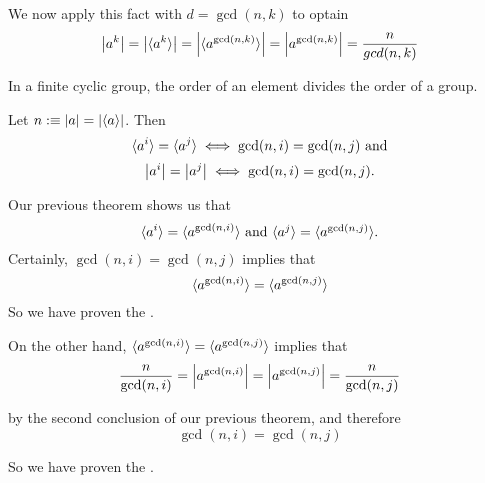 \begin{prf}
  We now apply this fact with $d=\gcd(n,k)$ to optain
  \begin{equation}
    \abs{a^k} = \abs{\langle a^k \rangle} = \abs{ \langle a^{\gcd (n,k)} \rangle } = \abs{a^{\gcd(n,k)}} = \frac{n}{gcd(n,k)}
  \end{equation}
\end{prf}

\setcounter{corollary}{0}

\begin{corollary}
  In a finite cyclic group, the order of an element divides the order of a group.
\end{corollary}

\begin{corollary}[Criterion for $\la a^i \ra = \la a^j \ra$ and $\abs{a^i} = \abs{a^j}$]
  Let $n:\equiv \abs{a}=\abs{\langle a \rangle}$. Then
  \begin{equation}
    \la a^i \ra = \la a^j \ra \iff \gcd(n,i) = \gcd(n,j) $ and$
  \end{equation}
  \begin{equation}
    \abs{a^i} = \abs{a^j} \iff \gcd(n,i)=\gcd(n,j).
  \end{equation}
\end{corollary}
\begin{prf}
  Our previous theorem shows us that
  \begin{equation}
    \la a^i \ra = \la a^{\gcd(n,i)}\ra $ and $ \la a^j \ra = \la  a^{\gcd(n,j)} \ra.
  \end{equation}
  Certainly, $\gcd(n,i) = \gcd(n,j)$ implies that
  \begin{equation}
    \langle a^{\gcd(n,i)} \rangle = \langle a^{\gcd(n,j)} \rangle
  \end{equation}
  So we have proven the .

  On the other hand, $\langle a^{\gcd(n,i)} \rangle = \langle a^{\gcd(n,j)} \rangle$ implies that
  \begin{equation}
    \frac{n}{\gcd(n,i)}=\abs{a^{\gcd(n,i)} } = \abs{ a^{\gcd(n,j)} }=\frac{n}{\gcd(n,j)}
  \end{equation}

  by the second conclusion of our previous theorem, and therefore
  \begin{equation}
    \gcd(n,i) = \gcd(n,j)
  \end{equation}

  So we have proven the .
\end{prf}

